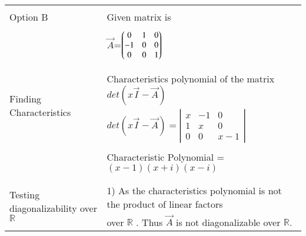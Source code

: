\documentclass[journal,12pt]{IEEEtran}
\begin{document}
\begin{longtable}{|l|l|}
\hline \hline
\multirow{3}{*}{Option B} & \\
& Given matrix is  \\
&\\
& $\vec{A}$=$\begin{pmatrix}0&1&0\\-1&0&0\\0&0&1\end{pmatrix}$\\
&\\
\hline
\multirow{3}{*}{Finding Characteristics} & \\
&
Characteristics polynomial of the matrix $det(x\vec{I}-\vec{A})$\\ 
polynomial
& $det(x\vec{I}-\vec{A})= \left|
                \begin{array}{ccc}
                x & -1 & 0\\
                1 & x & 0\\
                0 & 0 & x-1
                \end{array} \right|$  \\
&\\
& Characteristic Polynomial = $(x-1)(x+i)(x-i)$\\
&\\
\hline
\multirow{3}{*}{Testing diagonalizability over $\mathbb{R}$} & \\
& 1) As the characteristics  polynomial is not the product of linear factors\\
&over $\mathbb{R}$ . Thus $\vec{A}$ is not diagonalizable over $\mathbb{R}$.\\


\end{longtable}
\end{document}
